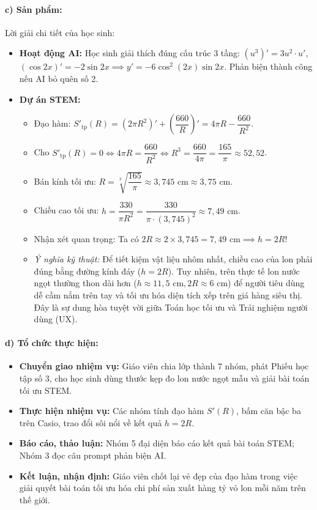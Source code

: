 \documentclass[12pt, a4paper]{article}
\begin{document}
\paragraph{c) Sản phẩm:} Lời giải chi tiết của học sinh:
\begin{itemize}[leftmargin=0.8cm]
    \item \textbf{Hoạt động AI:} Học sinh giải thích đúng cấu trúc 3 tầng: $(u^3)' = 3u^2 \cdot u'$, $(\cos 2x)' = -2\sin 2x \implies y' = -6\cos^2(2x)\sin 2x$. Phản biện thành công nếu AI bỏ quên số 2.
    \item \textbf{Dự án STEM:}
    \begin{itemize}[leftmargin=0.4cm]
        \item Đạo hàm: $S'_{\text{tp}}(R) = (2\pi R^2)' + \left(\dfrac{660}{R}\right)' = 4\pi R - \dfrac{660}{R^2}$.
        \item Cho $S'_{\text{tp}}(R) = 0 \iff 4\pi R = \dfrac{660}{R^2} \iff R^3 = \dfrac{660}{4\pi} = \dfrac{165}{\pi} \approx 52{,}52$.
        \item Bán kính tối ưu: $R = \sqrt[3]{\dfrac{165}{\pi}} \approx 3{,}745\text{ cm} \approx 3{,}75\text{ cm}$.
        \item Chiều cao tối ưu: $h = \dfrac{330}{\pi R^2} = \dfrac{330}{\pi \cdot (3{,}745)^2} \approx 7{,}49\text{ cm}$.
        \item Nhận xét quan trọng: Ta có $2R \approx 2 \times 3{,}745 = 7{,}49\text{ cm} \implies h = 2R$!
        \item \textit{Ý nghĩa kỹ thuật:} Để tiết kiệm vật liệu nhôm nhất, chiều cao của lon phải đúng bằng đường kính đáy ($h = 2R$). Tuy nhiên, trên thực tế lon nước ngọt thường thon dài hơn ($h \approx 11{,}5\text{ cm}, 2R \approx 6\text{ cm}$) để người tiêu dùng dễ cầm nắm trên tay và tối ưu hóa diện tích xếp trên giá hàng siêu thị. Đây là sự dung hòa tuyệt vời giữa Toán học tối ưu và Trải nghiệm người dùng (UX).
    \end{itemize}
\end{itemize}

\paragraph{d) Tổ chức thực hiện:}
\begin{itemize}[leftmargin=0.8cm]
    \item \textbf{Chuyển giao nhiệm vụ:} Giáo viên chia lớp thành 7 nhóm, phát Phiếu học tập số 3, cho học sinh dùng thước kẹp đo lon nước ngọt mẫu và giải bài toán tối ưu STEM.
    \item \textbf{Thực hiện nhiệm vụ:} Các nhóm tính đạo hàm $S'(R)$, bấm căn bậc ba trên Casio, trao đổi sôi nổi về kết quả $h = 2R$.
    \item \textbf{Báo cáo, thảo luận:} Nhóm 5 đại diện báo cáo kết quả bài toán STEM; Nhóm 3 đọc câu prompt phản biện AI.
    \item \textbf{Kết luận, nhận định:} Giáo viên chốt lại vẻ đẹp của đạo hàm trong việc giải quyết bài toán tối ưu hóa chi phí sản xuất hàng tỷ vỏ lon mỗi năm trên thế giới.
\end{itemize}
\end{document}
